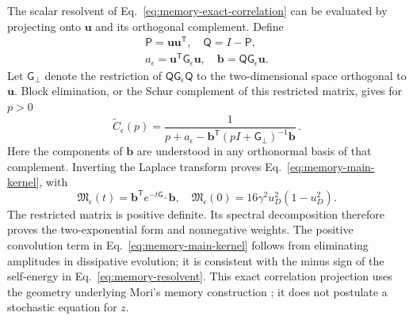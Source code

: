 \documentclass[aps,pre,reprint,amsmath,amssymb,longbibliography,floatfix]{revtex4-2}
\begin{document}
The scalar resolvent of Eq.~\eqref{eq:memory-exact-correlation} can be
evaluated by projecting onto $\boldsymbol u$ and its orthogonal
complement. Define
\begin{equation}
 \begin{gathered}
 \mathsf P=\boldsymbol u\boldsymbol u^{\mathsf T},\quad
 \mathsf Q=I-\mathsf P,\\
 a_\epsilon=\boldsymbol u^{\mathsf T}\mathsf G_\epsilon\boldsymbol u,\quad
 \boldsymbol b=\mathsf Q\mathsf G_\epsilon\boldsymbol u.
 \end{gathered}
\end{equation}
Let $\mathsf G_\perp$ denote the restriction of
$\mathsf Q\mathsf G_\epsilon\mathsf Q$ to the two-dimensional space
orthogonal to $\boldsymbol u$. Block elimination, or the Schur
complement of this restricted matrix, gives for $p>0$
\begin{equation}
 \widetilde C_\epsilon(p)
 =\frac{1}{p+a_\epsilon-
 \boldsymbol b^{\mathsf T}(pI+\mathsf G_\perp)^{-1}\boldsymbol b}\,.
 \label{eq:memory-resolvent}
\end{equation}
Here the components of $\boldsymbol b$ are understood in any
orthonormal basis of that complement. Inverting the Laplace transform
proves Eq.~\eqref{eq:memory-main-kernel}, with
\begin{equation}
 \mathfrak M_\epsilon(t)
 =\boldsymbol b^{\mathsf T}e^{-t\mathsf G_\perp}\boldsymbol b,
 \quad
 \mathfrak M_\epsilon(0)
 =16\gamma^2u_D^2(1-u_D^2).
 \label{eq:memory-exact-kernel}
\end{equation}
The restricted matrix is positive definite. Its spectral decomposition
therefore proves the two-exponential form and nonnegative weights.
The positive convolution term in Eq.~\eqref{eq:memory-main-kernel}
follows from eliminating amplitudes in dissipative evolution;
it is consistent with the minus sign of the self-energy in
Eq.~\eqref{eq:memory-resolvent}. This exact correlation projection
uses the geometry underlying Mori's memory construction
\cite{Mori1965}; it does not postulate a stochastic equation for $z$.
\end{document}
